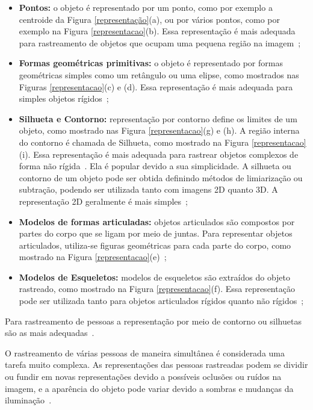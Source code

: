 	\begin{itemize}
		\item \textbf{Pontos:} o objeto é representado por um ponto, como por exemplo a centroide da Figura \ref{representação}(a), ou por vários pontos, como por exemplo na Figura \ref{representacao}(b). Essa representação é mais adequada para rastreamento de objetos que ocupam uma pequena região na imagem~\cite{yilmaz};

		\item \textbf{Formas geométricas primitivas:} o objeto é representado por formas geométricas simples como um retângulo ou uma elipse, como mostrados nas Figuras \ref{representacao}(c) e (d). Essa representação é mais adequada para simples objetos rígidos~\cite{yilmaz};

		\item \textbf{Silhueta e Contorno:} representação por contorno define os limites de um objeto, como mostrado nas Figura \ref{representacao}(g) e (h). A região interna do contorno é chamada de Silhueta, como mostrado na Figura \ref{representacao}(i). Essa representação é mais adequada para rastrear objetos complexos de forma não rígida~\cite{yilmaz}. Ela é popular devido a sua simplicidade. A silhueta ou contorno de um objeto pode ser obtida definindo métodos de limiarização ou subtração, podendo ser utilizada tanto com imagens 2D quanto 3D. A representação 2D geralmente é mais simples~\cite{moeslund};

		\item \textbf{Modelos de formas articuladas:} objetos articulados são compostos por partes do corpo que se ligam por meio de juntas. Para representar objetos articulados, utiliza-se figuras geométricas para cada parte do corpo, como mostrado na Figura \ref{representacao}(e)~\cite{yilmaz};

		\item \textbf{Modelos de Esqueletos:} modelos de esqueletos são extraídos do objeto rastreado, como mostrado na Figura \ref{representacao}(f). Essa representação pode ser utilizada tanto para objetos articulados rígidos quanto não rígidos~\cite{yilmaz};
	\end{itemize}

	Para rastreamento de pessoas a representação por meio de contorno ou silhuetas são as mais adequadas~\cite{yilmaz}.

	O rastreamento de várias pessoas de maneira simultânea é considerada uma tarefa muito complexa. As representações das pessoas rastreadas podem se dividir ou fundir em novas representações devido a possíveis oclusões ou ruídos na imagem, e a aparência do objeto pode variar devido a sombras e mudanças da iluminação~\cite{moeslund}.

